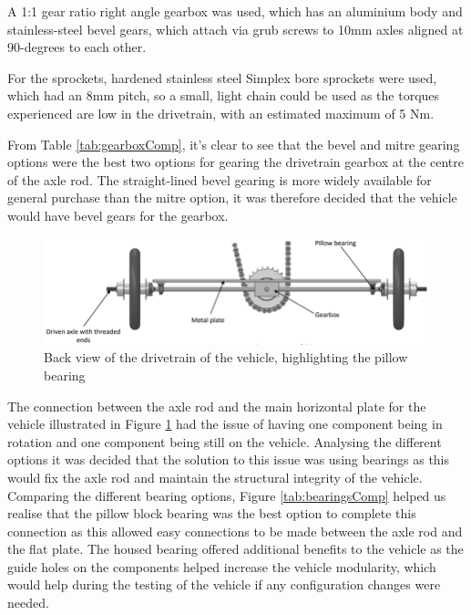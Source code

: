 A 1:1 gear ratio right angle gearbox was used, which has an aluminium body and stainless-steel bevel gears, which attach via grub screws to 10mm axles aligned at 90-degrees to each other.

For the sprockets, hardened stainless steel Simplex bore sprockets were used, which had an 8mm pitch, so a small, light chain could be used as the torques experienced are low in the drivetrain, with an estimated maximum of 5 Nm.



From Table \ref{tab:gearboxComp}, it’s clear to see that the bevel and mitre gearing options were the best two options for gearing the drivetrain gearbox at the centre of the axle rod. The straight-lined bevel gearing is more widely available for general purchase than the mitre option, it was therefore decided that the vehicle would have bevel gears for the gearbox.




\begin{figure}[!htbp]
    \centering
    \includegraphics[width=\linewidth]{images/part9/drivetrainbackview.png}
    \caption{Back view of the drivetrain of the vehicle, highlighting the pillow bearing}
    \label{fig:drivetrainBackView}
\end{figure}

The connection between the axle rod and the main horizontal plate for the vehicle illustrated in Figure \ref{fig:drivetrainBackView} had the issue of having one component being in rotation and one component being still on the vehicle. Analysing the different options it was decided that the solution to this issue was using bearings as this would fix the axle rod and maintain the structural integrity of the vehicle. Comparing the different bearing options, Figure \ref{tab:bearingsComp} helped us realise that the pillow block bearing was the best option to complete this connection as this allowed easy connections to be made between the axle rod and the flat plate. The housed bearing offered additional benefits to the vehicle as the guide holes on the components helped increase the vehicle modularity, which would help during the testing of the vehicle if any configuration changes were needed.



